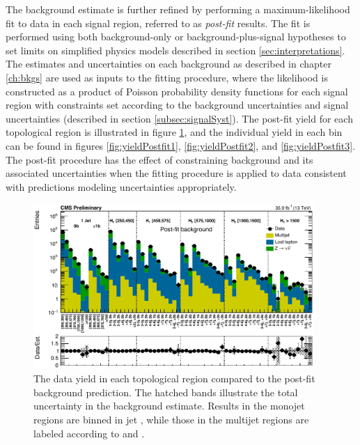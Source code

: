 The background estimate is further refined by performing a maximum-likelihood fit to data in each signal region, referred to as {\it post-fit} results. The fit is performed using both background-only or background-plus-signal hypotheses to set limits on simplified physics models described in section \ref{sec:interpretations}. The estimates and uncertainties on each background as described in chapter \ref{ch:bkgs} are  used as inputs to the fitting procedure, where the likelihood is constructed as a product of Poisson probability density functions for each signal region with constraints set according to the background uncertainties and signal uncertainties (described in section \ref{subsec:signalSyst}). The post-fit yield for each topological region is illustrated in figure \ref{fig:yieldPostfitTopological}, and the individual yield in each \mttwo bin can be found in figures \ref{fig:yieldPostfit1}, \ref{fig:yieldPostfit2}, and \ref{fig:yieldPostfit3}. The post-fit procedure has the effect of constraining background and its associated uncertainties when the fitting procedure is applied to data consistent with predictions modeling uncertainties appropriately.
\begin{figure}
	\centering
	\includegraphics[width=0.95\textwidth]{results/figs/postfit/mt2_ALL_fullEstimate}
	\caption{The data yield in each topological region compared to the post-fit background prediction. The hatched bands illustrate the total uncertainty in the background estimate. Results in the monojet regions are binned in jet \pt, while those in the multijet regions are labeled according to \nj and \nb.}
	\label{fig:yieldPostfitTopological}
\end{figure}
